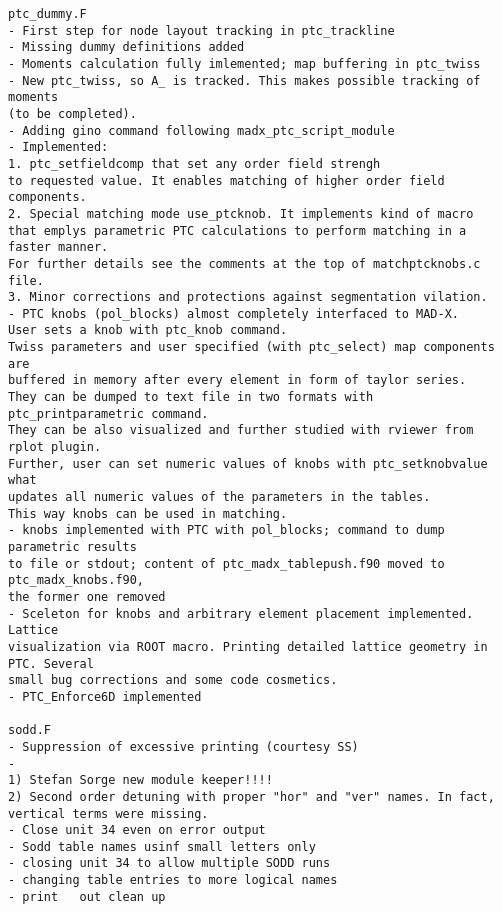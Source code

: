 \begin{verbatim}
ptc_dummy.F
- First step for node layout tracking in ptc_trackline
- Missing dummy definitions added
- Moments calculation fully imlemented; map buffering in ptc_twiss
- New ptc_twiss, so A_ is tracked. This makes possible tracking of moments 
(to be completed).
- Adding gino command following madx_ptc_script_module
- Implemented:
1. ptc_setfieldcomp that set any order field strengh
to requested value. It enables matching of higher order field components.
2. Special matching mode use_ptcknob. It implements kind of macro
that emplys parametric PTC calculations to perform matching in a faster manner.
For further details see the comments at the top of matchptcknobs.c file.
3. Minor corrections and protections against segmentation vilation.
- PTC knobs (pol_blocks) almost completely interfaced to MAD-X.
User sets a knob with ptc_knob command.
Twiss parameters and user specified (with ptc_select) map components are
buffered in memory after every element in form of taylor series.
They can be dumped to text file in two formats with ptc_printparametric command.
They can be also visualized and further studied with rviewer from rplot plugin.
Further, user can set numeric values of knobs with ptc_setknobvalue what
updates all numeric values of the parameters in the tables.
This way knobs can be used in matching.
- knobs implemented with PTC with pol_blocks; command to dump parametric results 
to file or stdout; content of ptc_madx_tablepush.f90 moved to ptc_madx_knobs.f90, 
the former one removed
- Sceleton for knobs and arbitrary element placement implemented. Lattice 
visualization via ROOT macro. Printing detailed lattice geometry in PTC. Several 
small bug corrections and some code cosmetics.
- PTC_Enforce6D implemented

sodd.F
- Suppression of excessive printing (courtesy SS)
- 
1) Stefan Sorge new module keeper!!!!
2) Second order detuning with proper "hor" and "ver" names. In fact,
vertical terms were missing.
- Close unit 34 even on error output
- Sodd table names usinf small letters only
- closing unit 34 to allow multiple SODD runs
- changing table entries to more logical names
- print   out clean up


\end{verbatim}
